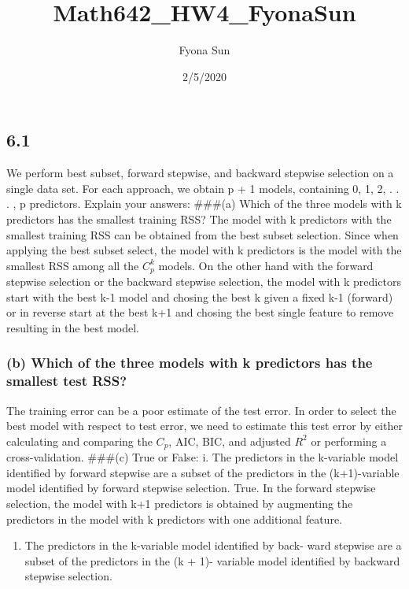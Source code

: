 \documentclass[]{article}
\title{Math642\_HW4\_FyonaSun}
\author{Fyona Sun}
\date{2/5/2020}
\providecommand{\tightlist}{%
  \setlength{\itemsep}{0pt}\setlength{\parskip}{0pt}}
\begin{document}
\maketitle

\subsection{6.1}\label{section}

We perform best subset, forward stepwise, and backward stepwise
selection on a single data set. For each approach, we obtain p + 1
models, containing 0, 1, 2, . . . , p predictors. Explain your answers:
\#\#\#(a) Which of the three models with k predictors has the smallest
training RSS? The model with k predictors with the smallest training RSS
can be obtained from the best subset selection. Since when applying the
best subset select, the model with k predictors is the model with the
smallest RSS among all the \(C_p^k\) models. On the other hand with the
forward stepwise selection or the backward stepwise selection, the model
with k predictors start with the best k-1 model and chosing the best k
given a fixed k-1 (forward) or in reverse start at the best k+1 and
chosing the best single feature to remove resulting in the best model.

\subsubsection{(b) Which of the three models with k predictors has the
smallest test
RSS?}\label{b-which-of-the-three-models-with-k-predictors-has-the-smallest-test-rss}

The training error can be a poor estimate of the test error. In order to
select the best model with respect to test error, we need to estimate
this test error by either calculating and comparing the \(C_p\), AIC,
BIC, and adjusted \(R^2\) or performing a cross-validation. \#\#\#(c)
True or False: i. The predictors in the k-variable model identified by
forward stepwise are a subset of the predictors in the (k+1)-variable
model identified by forward stepwise selection. True. In the forward
stepwise selection, the model with k+1 predictors is obtained by
augmenting the predictors in the model with k predictors with one
additional feature.

\begin{enumerate}
\def\labelenumi{\roman{enumi}.}
\setcounter{enumi}{1}
\tightlist
\item
  The predictors in the k-variable model identified by back- ward
  stepwise are a subset of the predictors in the (k + 1)- variable model
  identified by backward stepwise selection.
\end{enumerate}
\end{document}
